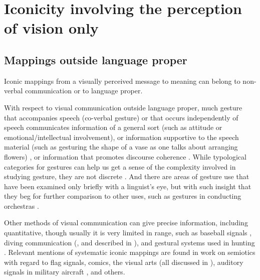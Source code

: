 \documentclass[output=paper,
modfonts
]{LSP/langsci}
\begin{document}
\section{Iconicity involving the perception of vision only}

\subsection{Mappings outside language proper}

Iconic mappings from a visually perceived message to meaning can belong
to non-verbal communication \citep{argyle1975,knapp2013}
or to language proper.

With respect to visual communication outside language proper, much
gesture that accompanies speech (co-verbal gesture) or that occurs
independently of speech communicates information of a general sort (such
as attitude or emotional/intellectual involvement), or information
supportive to the speech material (such as gesturing the shape of a vase
as one talks about arranging flowers) \citep{mcneill1992,mcneill2000,goldin-1999,kendon2004,ozyurek2014}, or information that promotes discourse
coherence \citep{lascarides2009}. While typological categories for
gestures can help us get a sense of the complexity involved in studying
gesture, they are not discrete \citep{streeck2009}. And there are areas of
gesture use that have been examined only briefly with a linguist's eye,
but with such insight that they beg for further comparison to other
uses, such as gestures in conducting orchestras \citep{boyes-2000}.

Other methods of visual communication can give precise information,
including quantitative, though usually it is very limited in range, such
as baseball signals \citep{komissaroff2016}, diving communication (\citealt{RSTC2005},
and described in \citealt{miskovic2016}), and gestural systems used in
hunting \citep{hindley2014}. Relevant mentions of systematic iconic mappings
are found in work on semiotics with regard to flag signals, comics, the
visual arts (all discussed in \citealt{berger1984}), auditory signals in military
aircraft \citep{doll1986}, and others.
\end{document}
